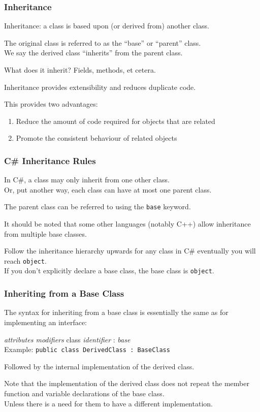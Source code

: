 \begin{frame}
\frametitle{Inheritance}

Inheritance: a class is based upon (or derived from) another class.

The original class is referred to as the ``base'' or ``parent'' class.\\
\quad We say the derived class ``inherits'' from the parent class.

What does it inherit? Fields, methods, et cetera.

Inheritance provides extensibility and reduces duplicate code.

This provides two advantages:
\begin{enumerate}
    \item Reduce the amount of code required for objects that are related
    \item Promote the consistent behaviour of related objects
\end{enumerate}

\end{frame}

\begin{frame}
\frametitle{C\# Inheritance Rules}

In C\#, a class may only inherit from one other class.\\
\quad Or, put another way, each class can have at most one parent class.

The parent class can be referred to using the \texttt{base} keyword.

It should be noted that some other languages (notably C++) allow inheritance from multiple base classes.

Follow the inheritance hierarchy upwards for any class in C\# eventually you will reach \texttt{object}.\\
\quad If you don't explicitly declare a base class, the base class is \texttt{object}.

\end{frame}


\begin{frame}
\frametitle{Inheriting from a Base Class}

The syntax for inheriting from a base class is essentially the same as for implementing an interface:

\textit{attributes modifiers} class \textit{identifier} : \textit{base}\\
\quad Example: \texttt{public class DerivedClass : BaseClass}

Followed by the internal implementation of the derived class.

Note that the implementation of the derived class does not repeat the member function and variable declarations of the base class.\\
\quad Unless there is a need for them to have a different implementation.

\end{frame}


